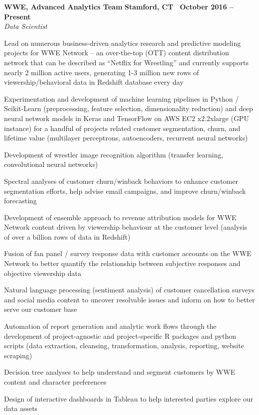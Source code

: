 \documentclass[10pt]{article}
\newcommand{\leftandright}[2]{\noindent\textbf{#1}\hfill
\textbf{#2}}
\begin{document}
\leftandright{WWE, Advanced Analytics Team}{Stamford, CT \textbullet\, October
2016 -- Present} \\  
\vspace{-0.8em}
\textit{Data Scientist} 
\begin{itemize*}
  \item Lead on numerous business-driven analytics research and
    predictive modeling projects for WWE Network -- an
    over-the-top (OTT) content distribution network  that can be
    described as ``Netflix for Wrestling'' and currently supports nearly
    2 million active users, generating 1-3 million new rows of viewership/behavioral 
    data in Redshift database every day
  \item Experimentation and development of machine learning pipelines
    in Python / Scikit-Learn (preprocessing, feature selection, dimensionality reduction) and 
    deep neural network models in Keras and TensorFlow 
    on AWS EC2 x2.2xlarge (GPU instance) for a handful of projects related customer segmentation, churn, 
    and lifetime value (multilayer perceptrons, autoencoders, recurrent
    neural networks) 
  \item  Development of wrestler image recognition algorithm (transfer learning,
    convolutional neural networks)
  \item  Spectral analyses of customer churn/winback behaviors 
    to enhance customer segmentation efforts, help advise email campaigns, and
    improve churn/winback forecasting 
  \item Development of ensemble approach to revenue attribution models for WWE Network content
    driven by viewership behaviour at the customer level (analysis of
    over a billion rows of data in Redshift)
  \item  Fusion of fan panel / survey response data with customer accounts on the
    WWE Network to better quantify the relationship between
    subjective responses and objective viewership data
  \item Natural language processing (sentiment analysis) of customer cancellation surveys
    and social media content to uncover resolvable issues and inform on
    how to better serve our customer base
  \item  Automation of report generation and analytic work flows
    through the development of project-agnostic and project-specific R packages 
    and python scripts
    (data extraction, cleansing, transformation, analysis, reporting,
    website scraping)
  \item  Decision tree analyses to help understand and segment
    customers by WWE content and character preferences
  \item Design of interactive dashboards in Tableau to help interested
    parties explore our data assets
\end{itemize*}
\end{document}
